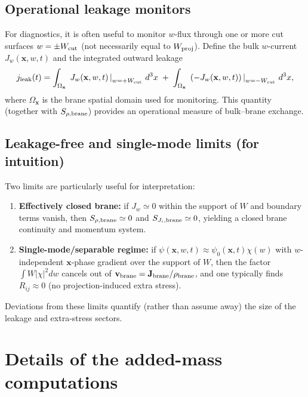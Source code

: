 \documentclass[11pt]{article}
\begin{document}
\subsection{Operational leakage monitors}
\label{app:leakage_monitors}

For diagnostics, it is often useful to monitor $w$-flux through one or more
cut surfaces $w=\pm W_{\rm cut}$ (not necessarily equal to $W_{\rm proj}$).
Define the bulk $w$-current $J_w(\mathbf{x},w,t)$ and the integrated outward leakage
\begin{equation}
j_{\rm leak}(t)
=
\int_{\Omega_{\mathbf{x}}}
\left.\,J_w(\mathbf{x},w,t)\,\right|_{w=+W_{\rm cut}}\,d^3x
\;+\;
\int_{\Omega_{\mathbf{x}}}
\left.\,(-J_w(\mathbf{x},w,t))\,\right|_{w=-W_{\rm cut}}\,d^3x,
\label{eq:j_leak_def}
\end{equation}
where $\Omega_{\mathbf{x}}$ is the brane spatial domain used for monitoring.
This quantity (together with $S_{\rho,{\rm brane}}$) provides an operational measure of
bulk--brane exchange.

\subsection{Leakage-free and single-mode limits (for intuition)}
\label{app:leakage_free_limits}

Two limits are particularly useful for interpretation:
\begin{enumerate}
\item \textbf{Effectively closed brane:} if $J_w\simeq 0$ within the support of $W$
and boundary terms vanish, then $S_{\rho,{\rm brane}}\simeq 0$ and
$S_{J_i,{\rm brane}}\simeq 0$, yielding a closed brane continuity and momentum system.
\item \textbf{Single-mode/separable regime:} if $\psi(\mathbf{x},w,t)\approx \psi_0(\mathbf{x},t)\chi(w)$
with $w$-independent $\mathbf{x}$-phase gradient over the support of $W$, then the factor
$\int W|\chi|^2dw$ cancels out of $\mathbf{v}_{\rm brane}=\mathbf{J}_{\rm brane}/\rho_{\rm brane}$,
and one typically finds $R_{ij}\approx 0$ (no projection-induced extra stress).
\end{enumerate}
Deviations from these limits quantify (rather than assume away) the size of the leakage
and extra-stress sectors.

\section{Details of the added-mass computations}
\label{app:added_mass}
\end{document}
